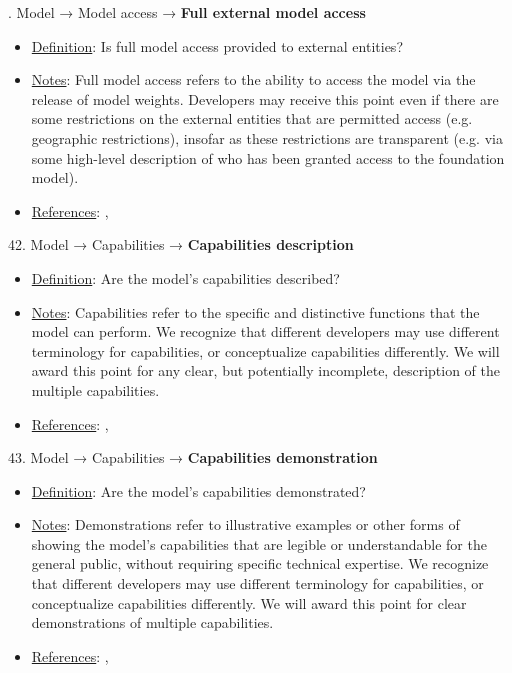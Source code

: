 . Model → Model access → \textbf{Full external model access}
\vspace{-\parskip}
\begin{itemize}
	\item
	\underline{Definition}: Is full model access provided to external entities?
	\item
	\underline{Notes}: Full model access refers to the ability to access the model via the release of model weights. Developers may receive this point even if there are some restrictions on the external entities that are permitted access (e.g. geographic restrictions), insofar as these restrictions are transparent (e.g. via some high-level description of who has been granted access to the foundation model).
	\item
	\underline{References}: \citet{solaiman2023gradient}, \citet{shevlane2022structured}
\end{itemize} \vspace{\baselineskip}


42. Model → Capabilities → \textbf{Capabilities description}
\vspace{-\parskip}
\begin{itemize}
	\item
	\underline{Definition}: Are the model's capabilities described?
	\item
	\underline{Notes}: Capabilities refer to the specific and distinctive functions that the model can perform. We recognize that different developers may use different terminology for capabilities, or conceptualize capabilities differently. We will award this point for any clear, but potentially incomplete, description of the multiple capabilities.
	\item
	\underline{References}: \citet{srivastava2022bigbench}, \citet{liang2022helm}
\end{itemize} \vspace{\baselineskip}


43. Model → Capabilities → \textbf{Capabilities demonstration}
\vspace{-\parskip}
\begin{itemize}
	\item
	\underline{Definition}: Are the model’s capabilities demonstrated?
	\item
	\underline{Notes}: Demonstrations refer to illustrative examples or other forms of showing the model's capabilities that are legible or understandable for the general public, without requiring specific technical expertise. We recognize that different developers may use different terminology for capabilities, or conceptualize capabilities differently. We will award this point for clear demonstrations of multiple capabilities.
	\item
	\underline{References}: \citet{srivastava2022bigbench}, \citet{liang2022helm}
\end{itemize} \vspace{\baselineskip}


